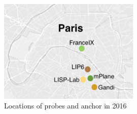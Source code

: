 \begin{figure}[!t]
	\centering
	\includegraphics[width=0.6\textwidth]{Pics/Probes_loc.eps}
	\caption{Locations of probes and anchor in 2016}
	\label{Probes_location_2016}
\end{figure}

